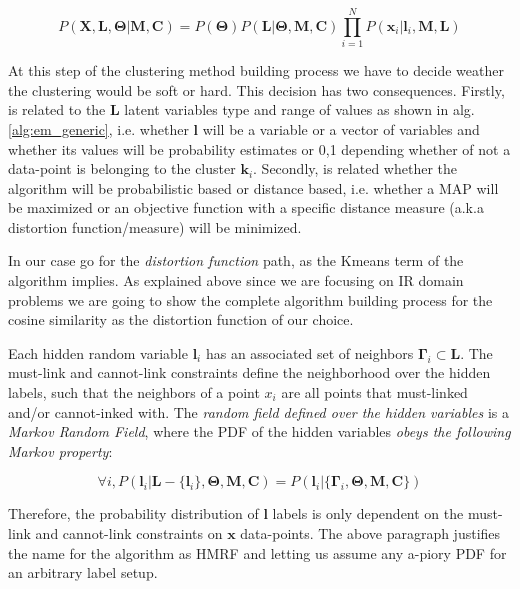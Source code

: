 \documentclass[dvips,dvipdfm,pdftex]{llncs}
\begin{document}
\begin{equation}
	P(\mathbf{X,L,\Theta}|\mathbf{M,C})=P(\mathbf{\Theta})P(\mathbf{L}|\mathbf{\Theta,M,C})\prod_{i=1}^{N}P(\mathbf{x}_{i}|\mathbf{l}_{i},\mathbf{M,L})
\label{eq:hmrm_em_MAP_or_MAX_Liklihood}
\end{equation}

At this step of the clustering method building process we have to decide weather the clustering would be soft or hard. This decision has two consequences. Firstly, is related to the $\mathbf{L}$ latent variables type and range of values as shown in alg.\ref{alg:em_generic}, i.e. whether $\mathbf{l}$ will be a variable or a vector of variables and whether its values will be probability estimates or {0,1} depending whether of not a data-point is belonging to the cluster $\mathbf{k}_{i}$. Secondly, is related whether the algorithm will be probabilistic based or distance based, i.e. whether a MAP will be maximized or an objective function with a specific distance measure (a.k.a distortion function/measure) will be minimized.

In our case go for the \emph{distortion function} path, as the Kmeans term of the algorithm implies. As explained above since we are focusing on IR domain problems we are going to show the complete algorithm building process for the cosine similarity as the distortion function of our choice.

Each hidden random variable $\mathbf{l}_i$ has an associated set of neighbors $\mathbf{\Gamma}_{i}\subset\mathbf{L}$. The must-link and cannot-link constraints define the neighborhood over the hidden labels, such that the neighbors of a point $x_{i}$ are all points that must-linked and/or cannot-inked with. The \emph{random field defined over the hidden variables} is a \emph{Markov Random Field}, where the PDF of the hidden variables \emph{obeys the following Markov property}:

\begin{equation}
	\forall i,P(\mathbf{l}_{i}|\mathbf{L-}\{\mathbf{l}_{i}\},\mathbf{\Theta},\mathbf{M},\mathbf{C})=P(\mathbf{l}_{i}|\{\mathbf{\Gamma}_{i},\mathbf{\Theta},\mathbf{M},\mathbf{C}\})
\label{eq:markov_property}
\end{equation}

Therefore, the probability distribution of $\mathbf{l}$ labels is only dependent on the must-link and cannot-link constraints on $\mathbf{x}$ data-points. The above paragraph justifies the name for the algorithm as HMRF and letting us assume any a-piory PDF for an arbitrary label setup.
\end{document}
